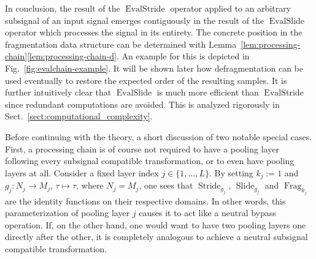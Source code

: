 \documentclass[journal]{IEEEtran}
\newcommand{\figurescalefactor}{0.995}
\newcommand{\discint}[2]{\{#1,\dotsc,#2\}}
\newcommand{\inint}[2]{\in\discint{#1}{#2}}
\DeclareMathOperator{\Slide}{Slide}
\DeclareMathOperator{\Stride}{Stride}
\DeclareMathOperator{\Fragmentation}{Frag}
\DeclareMathOperator{\EvalStride}{EvalStride}
\DeclareMathOperator{\EvalSlide}{EvalSlide}
\begin{document}
\begin{figure*}[t]
  \centering
  \scalebox{\figurescalefactor}{\texttt{[image: paper-pics.pdf]}}
  \caption{Example of the two notions of a one-layered ($L = 1$) processing chain with receptive field size $B = 5$ applied to an input signal $\xi$ with $D = 8$ samples.
    The processing chain consists of the $\operatorname{Quot}$ operator as subsignal compatible transformation followed by max-pooling with a stride of $k_1 = 2$.
    In this example, the processing chain is well-defined and all divisibility requirements are met.    
    The upper part shows the result of $\EvalSlide$ evaluated on $\xi$:
    Here, max-pooling is applied to $\operatorname{Quot}(\xi)$ in a sliding fashion, followed by fragmentation producing two fragments.
    The lower part shows the outcome of $\EvalStride$ applied to two different subsignals of length $B$.
    Max-pooling is used here in a strided fashion which halves dimensionality.
    It is evident that the outcome of $\EvalStride$ can be found within $\Slide_{\max}\left(\operatorname{Quot}(\xi)\right)$, although the individual output signals are interleaved (highlighted with a colored pattern in the graphics).
    The reordering through fragmentation corrects interleaving so that the outcome is always available contiguously.
    A second layer in the processing chain has then the ability to further process independent contiguous signals, which is particularly effective on real computing machines.}
  \label{fig:evalchain-example}
\end{figure*}

In conclusion, the result of the $\EvalStride$ operator applied to an arbitrary subsignal of an input signal emerges contiguously in the result of the $\EvalSlide$ operator which processes the signal in its entirety.
The concrete position in the fragmentation data structure can be determined with Lemma~\ref{lem:processing-chain}\ref{lem:processing-chain-d}.
An example for this is depicted in Fig.~\ref{fig:evalchain-example}.
It will be shown later how defragmentation can be used eventually to restore the expected order of the resulting samples.
It is further intuitively clear that $\EvalSlide$ is much more efficient than $\EvalStride$ since redundant computations are avoided.
This is analyzed rigorously in Sect.~\ref{sect:computational_complexity}.

Before continuing with the theory, a short discussion of two notable special cases.
First, a processing chain is of course not required to have a pooling layer following every subsignal compatible transformation, or to even have pooling layers at all.
Consider a fixed layer index $j\inint{1}{L}$.
By setting $k_j := 1$ and $g_j\colon N_j\to M_j$, $\tau\mapsto\tau$, where $N_j = M_j$, one sees that $\Stride_{g_j}$, $\Slide_{g_j}$ and $\Fragmentation_{k_j}$ are the identity functions on their respective domains.
In other words, this parameterization of pooling layer $j$ causes it to act like a neutral bypass operation.
If, on the other hand, one would want to have two pooling layers one directly after the other, it is completely analogous to achieve a neutral subsignal compatible transformation.
\end{document}
